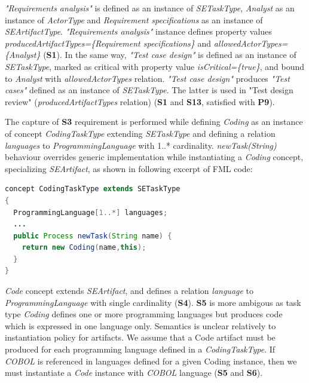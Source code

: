 
\textit{"Requirements analysis"} is defined as an instance of \textit{SETaskType}, \textit{Analyst} as an instance of \textit{ActorType} and \textit{Requirement specifications} as an instance of \textit{SEArtifactType}. \textit{"Requirements analysis"} instance defines property values \textit{producedArtifactTypes=\{Requirement specifications\}} and \textit{allowedActorTypes=\{Analyst\}} (\textbf{S1}). In the same way, \textit{"Test case design"} is defined as an instance of \textit{SETaskType}, marked as critical with property value \textit{isCritical=\{true\}}, and bound to \textit{Analyst} with \textit{allowedActorTypes} relation. \textit{"Test case design"} produces \textit{"Test cases"} defined as an instance of \textit{SETaskType}. The latter is used in "Test design review" (\textit{producedArtifactTypes} relation) (\textbf{S1} and \textbf{S13}, satisfied with \textbf{P9}). 

The capture of \textbf{S3} requirement is performed while defining \textit{Coding} as an instance of concept \textit{CodingTaskType} extending \textit{SETaskType} and defining a relation \textit{languages} to \textit{ProgrammingLanguage} with 1..* cardinality. \textit{newTask(String)} behaviour overrides generic implementation while instantiating a \textit{Coding} concept, specializing \textit{SEArtifact}, as shown in following excerpt of FML code:

\begin{lstlisting}[breaklines=true, language=java, basicstyle=\ttfamily\scriptsize, mathescape=true]
concept CodingTaskType extends SETaskType 
{
  ProgrammingLanguage[1..*] languages;
  ...
  public Process newTask(String name) {    
    return new Coding(name,this); 
  }
}    
\end{lstlisting}

\textit{Code} concept extends \textit{SEArtifact}, and defines a relation \textit{language} to \textit{ProgrammingLanguage} with single cardinality (\textbf{S4}). \textbf{S5} is more ambigous as task type \textit{Coding} defines one or more programming languages but produces code which is expressed in one language only. Semantics is unclear relatively to instantiation policy for artifacts. We assume that a Code artifact must be produced for each programming language defined in a \textit{CodingTaskType}. If \textit{COBOL} is referenced in languages defined for a given Coding instance, then we must instantiate a \textit{Code} instance with \textit{COBOL} language (\textbf{S5} and \textbf{S6}).

